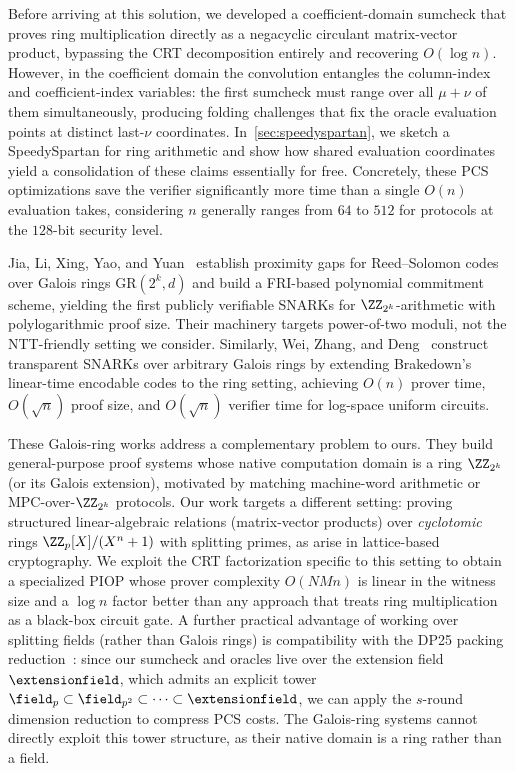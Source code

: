 Before arriving at this solution, we developed a coefficient-domain sumcheck that proves ring multiplication directly as a negacyclic circulant matrix-vector product, bypassing the CRT decomposition entirely and recovering $O(\log n)$.  However, in the coefficient domain the convolution entangles the column-index and coefficient-index variables: the first sumcheck must range over all $\mu + \nu$ of them simultaneously, producing folding challenges that fix the oracle evaluation points at distinct last-$\nu$ coordinates. In~\cref{sec:speedyspartan}, we sketch a SpeedySpartan for ring arithmetic and show how shared evaluation coordinates yield a consolidation of these claims essentially for free. Concretely, these PCS optimizations save the verifier significantly more time than a single $O(n)$ evaluation takes, considering $n$ generally ranges from $64$ to $512$ for protocols at the $128$-bit security level.

Jia, Li, Xing, Yao, and Yuan~\cite{C:JLXYY25} establish proximity gaps for Reed--Solomon codes over Galois rings $\mathrm{GR}(2^k, d)$ and build a FRI-based polynomial commitment scheme, yielding the first publicly verifiable SNARKs for $\ZZ_{2^k}$-arithmetic with polylogarithmic proof size.  Their machinery targets power-of-two moduli, not the NTT-friendly setting we consider. Similarly, Wei, Zhang, and Deng~\cite{PKC:WeiZhaDen25} construct transparent SNARKs over arbitrary Galois rings by extending Brakedown's~\cite{C:GLSTW23} linear-time encodable codes to the ring setting, achieving $O(n)$ prover time, $O(\sqrt{n})$ proof size, and $O(\sqrt{n})$ verifier time for log-space uniform circuits.

These Galois-ring works address a complementary problem to ours.
They build general-purpose proof systems whose native computation domain is a ring $\ZZ_{2^k}$ (or its Galois extension), motivated by matching machine-word arithmetic or MPC-over-$\ZZ_{2^k}$ protocols.
Our work targets a different setting: proving structured linear-algebraic relations (matrix-vector products) over \emph{cyclotomic} rings $\ZZ_p[X]/(X^n+1)$ with splitting primes, as arise in lattice-based cryptography.
We exploit the CRT factorization specific to this setting to obtain a specialized PIOP whose prover complexity $O(NMn)$ is linear in the witness size and a $\log n$ factor better than any approach that treats ring multiplication as a black-box circuit gate.  A further practical advantage of working over splitting fields (rather than Galois rings) is compatibility with the DP25 packing reduction~\cite{EC:DiaPos25}: since our sumcheck and oracles live over the extension field $\extensionfield$, which admits an explicit tower $\field_p \subset \field_{p^2} \subset \cdots \subset \extensionfield$, we can apply the $s$-round dimension reduction to compress PCS costs. The Galois-ring systems cannot directly exploit this tower structure, as their native domain is a ring rather than a field.


